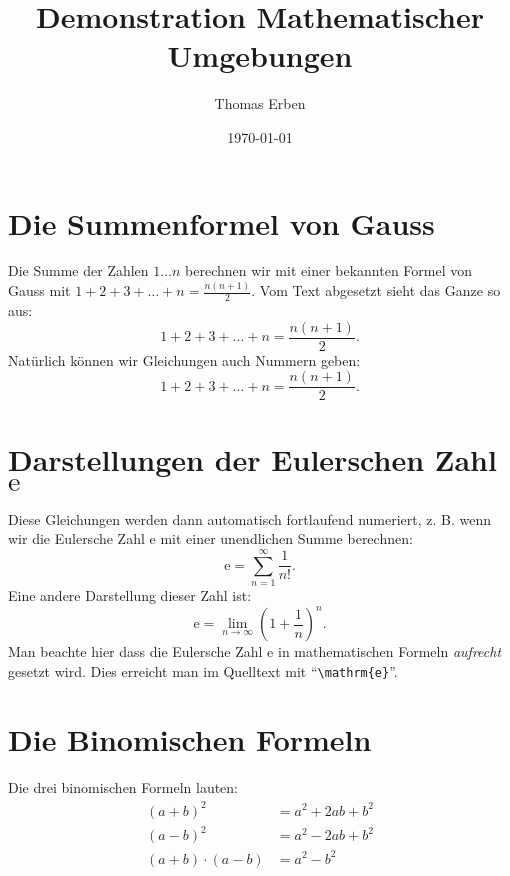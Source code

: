 \documentclass[a4paper,12pt]{article}
\title{Demonstration Mathematischer Umgebungen}
\author{Thomas Erben}
\date{\today}
\begin{document}
\maketitle

%
%
%
\section{Die Summenformel von Gauss}
Die Summe der Zahlen $1\ldots n$ berechnen wir mit einer bekannten Formel
von Gauss mit $1+2+3+\ldots+n=\frac{n(n+1)}2$. Vom Text abgesetzt sieht 
das Ganze so aus:
%
\[
  1+2+3+\ldots+n=\frac{n(n+1)}2.
\]
Natürlich können wir Gleichungen auch Nummern geben:
%
\begin{equation}
  1+2+3+\ldots+n=\frac{n(n+1)}2.
\end{equation}
%
\section{Darstellungen der Eulerschen Zahl
  $\mathrm{e}$}
Diese Gleichungen werden dann automatisch fortlaufend numeriert, z. B. wenn wir
die Eulersche Zahl $\mathrm{e}$ mit einer unendlichen Summe berechnen:
%
\begin{equation}
  \mathrm{e}=\sum_{n=1}^{\infty}\frac 1{n!}.
\end{equation}
Eine andere Darstellung dieser Zahl ist:
%
\begin{equation}
  \mathrm{e}=\lim_{n\to\infty}\left(1+\frac 1n\right)^n.
\end{equation}
Man beachte hier dass die Eulersche Zahl $\mathrm{e}$ in
mathematischen Formeln \emph{aufrecht} gesetzt wird. Dies erreicht man
im Quelltext mit \enquote{\texttt{\textbackslash mathrm\{e\}}}.
%
\section{Die Binomischen Formeln}
Die drei binomischen Formeln lauten:
%
\begin{align}
  (a+b)^2 & = a^2+2ab+b^2 \nonumber \\
  (a-b)^2 & = a^2-2ab+b^2  \\
  (a+b)\cdot(a-b) & = a^2-b^2 \nonumber
\end{align}
%
\end{document}

